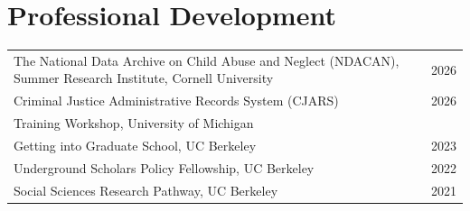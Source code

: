\section{\sc Professional Development}
\begin{tabular}{@{}p{4.25in}p{2in}}

The National Data Archive on Child Abuse and Neglect (NDACAN), Summer Research Institute, Cornell University & 2026 \\

Criminal Justice Administrative Records System (CJARS) & 2026  \\ Training Workshop, University of Michigan \\

Getting into Graduate School, UC Berkeley & 2023 \\

Underground Scholars Policy Fellowship, UC Berkeley & 2022 \\

Social Sciences Research Pathway, UC Berkeley & 2021 \\





\end{tabular}

\endinput